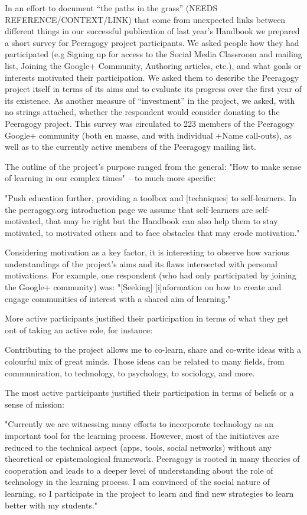 \documentclass{acm_proc_article-sp}
\begin{document}
In an effort to document ``the paths in the grass'' (NEEDS REFERENCE/CONTEXT/LINK) that come from unexpected links between different things in our successful publication of last year's Handbook we prepared a short survey for Peeragogy project participants. We asked people how they had participated (e.g Signing up for access to the Social Media Classroom and mailing list, Joining the Google+ Community, Authoring articles, etc.), and what goals or interests motivated their participation. We asked them to describe the Peeragogy project itself in terms of its aims and to evaluate its progress over the first year of its existence. As another measure of ``investment'' in the project, we asked, with no strings attached, whether the respondent would consider donating to the Peeragogy project. This survey was circulated to 223 members of the Peeragogy Google+ community (both en masse, and with individual +Name call-outs), as well as to the currently active members of the Peeragogy mailing list.

The outline of the project's purpose ranged from the general: "How to make sense of learning in our complex times" -- to much more specific:

"Push education further, providing a toolbox and [techniques] to self-learners. In the peeragogy.org introduction page we assume that self-learners are self-motivated, that may be right but the Handbook can also help them to stay motivated, to motivated others and to face obstacles that may erode motivation."

Considering motivation as a key factor, it is interesting to observe how various understandings of the project's aims and its flaws intersected with personal motivations. For example, one respondent (who had only participated by joining the Google+ community) was: "[Seeking] [i]nformation on how to create and engage communities of interest with a shared aim of learning."

More active participants justified their participation in terms of what they get out of taking an active role, for instance:

Contributing to the project allows me to co-learn, share and co-write ideas with a colourful mix of great minds. Those ideas can be related to many fields, from communication, to technology, to psychology, to sociology, and more.

The most active participants justified their participation in terms of beliefs or a sense of mission:

"Currently we are witnessing many efforts to incorporate technology as an important tool for the learning process. However, most of the initiatives are reduced to the technical aspect (apps, tools, social networks) without any theoretical or epistemological framework. Peeragogy is rooted in many theories of cooperation and leads to a deeper level of understanding about the role of technology in the learning process. I am convinced of the social nature of learning, so I participate in the project to learn and find new strategies to learn better with my students."
\end{document}
